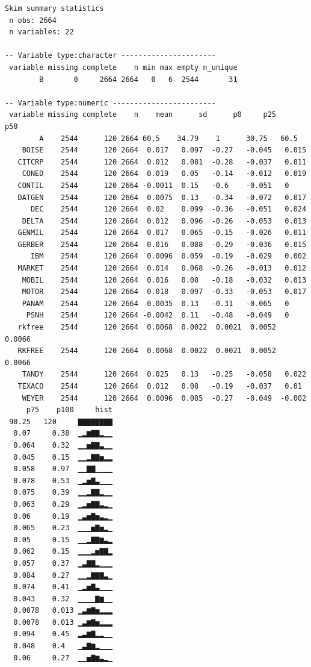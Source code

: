\documentclass[]{book}
\begin{document}
\begin{verbatim}
Skim summary statistics
 n obs: 2664 
 n variables: 22 

-- Variable type:character ----------------------
 variable missing complete    n min max empty n_unique
        B       0     2664 2664   0   6  2544       31

-- Variable type:numeric ------------------------
 variable missing complete    n    mean      sd      p0     p25     p50
        A    2544      120 2664 60.5    34.79    1      30.75   60.5   
    BOISE    2544      120 2664  0.017   0.097  -0.27   -0.045   0.015 
   CITCRP    2544      120 2664  0.012   0.081  -0.28   -0.037   0.011 
    CONED    2544      120 2664  0.019   0.05   -0.14   -0.012   0.019 
   CONTIL    2544      120 2664 -0.0011  0.15   -0.6    -0.051   0     
   DATGEN    2544      120 2664  0.0075  0.13   -0.34   -0.072   0.017 
      DEC    2544      120 2664  0.02    0.099  -0.36   -0.051   0.024 
    DELTA    2544      120 2664  0.012   0.096  -0.26   -0.053   0.013 
   GENMIL    2544      120 2664  0.017   0.065  -0.15   -0.026   0.011 
   GERBER    2544      120 2664  0.016   0.088  -0.29   -0.036   0.015 
      IBM    2544      120 2664  0.0096  0.059  -0.19   -0.029   0.002 
   MARKET    2544      120 2664  0.014   0.068  -0.26   -0.013   0.012 
    MOBIL    2544      120 2664  0.016   0.08   -0.18   -0.032   0.013 
    MOTOR    2544      120 2664  0.018   0.097  -0.33   -0.053   0.017 
    PANAM    2544      120 2664  0.0035  0.13   -0.31   -0.065   0     
     PSNH    2544      120 2664 -0.0042  0.11   -0.48   -0.049   0     
   rkfree    2544      120 2664  0.0068  0.0022  0.0021  0.0052  0.0066
   RKFREE    2544      120 2664  0.0068  0.0022  0.0021  0.0052  0.0066
    TANDY    2544      120 2664  0.025   0.13   -0.25   -0.058   0.022 
   TEXACO    2544      120 2664  0.012   0.08   -0.19   -0.037   0.01  
    WEYER    2544      120 2664  0.0096  0.085  -0.27   -0.049  -0.002 
     p75    p100     hist
 90.25   120     ▇▇▇▇▇▇▇▇
  0.07     0.38  ▁▂▆▇▇▂▁▁
  0.064    0.32  ▁▁▅▇▇▃▁▁
  0.045    0.15  ▁▁▂▇▇▅▂▂
  0.058    0.97  ▁▁▇▇▁▁▁▁
  0.078    0.53  ▁▂▅▇▃▁▁▁
  0.075    0.39  ▁▁▂▇▇▂▁▁
  0.063    0.29  ▁▂▅▇▇▃▂▁
  0.06     0.19  ▁▃▅▇▅▃▂▁
  0.065    0.23  ▁▁▁▅▇▅▂▁
  0.05     0.15  ▁▁▂▇▇▆▃▂
  0.062    0.15  ▁▁▁▂▅▇▇▂
  0.057    0.37  ▁▃▇▇▂▁▁▁
  0.084    0.27  ▁▁▂▇▇▇▃▁
  0.074    0.41  ▁▂▅▇▃▁▁▁
  0.043    0.32  ▁▁▁▁▇▆▁▁
  0.0078   0.013 ▁▃▆▇▅▂▂▂
  0.0078   0.013 ▁▃▆▇▅▂▂▂
  0.094    0.45  ▂▃▆▇▂▂▁▁
  0.048    0.4   ▁▃▇▆▂▁▁▁
  0.06     0.27  ▁▁▅▇▆▃▂▁
\end{verbatim}
\end{document}
